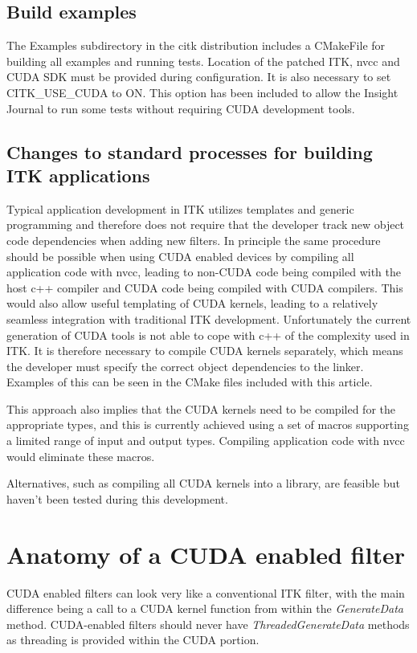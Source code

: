 \documentclass{InsightArticle}
\begin{document}
\subsection{Build examples}
The Examples subdirectory in the citk distribution includes a
CMakeFile for building all examples and running tests. Location of the
patched ITK, nvcc and CUDA SDK must be provided during
configuration. It is also necessary to set CITK\_USE\_CUDA to ON. This
option has been included to allow the Insight Journal to run some
tests without requiring CUDA development tools.

\subsection{Changes to standard processes for building ITK applications}
Typical application development in ITK utilizes templates and generic
programming and therefore does not require that the developer track
new object code dependencies when adding new filters. In principle the
same procedure should be possible when using CUDA enabled devices by
compiling all application code with nvcc, leading to non-CUDA code
being compiled with the host c++ compiler and CUDA code being compiled
with CUDA compilers. This would also allow useful templating of CUDA
kernels, leading to a relatively seamless integration with traditional
ITK development. Unfortunately the current generation of CUDA tools is
not able to cope with c++ of the complexity used in ITK. It is
therefore necessary to compile CUDA kernels separately, which means
the developer must specify the correct object dependencies to the
linker. Examples of this can be seen in the CMake files included with
this article.

This approach also implies that the CUDA kernels need to be compiled
for the appropriate types, and this is currently achieved using a set
of macros supporting a limited range of input and output
types. Compiling application code with nvcc would eliminate these
macros.

Alternatives, such as compiling all CUDA kernels into a library, are
feasible but haven't been tested during this development.



\section{Anatomy of a CUDA enabled filter}
CUDA enabled filters can look very like a conventional ITK filter,
with the main difference being a call to a CUDA kernel function from
within the {\em GenerateData} method. CUDA-enabled filters should
never have {\em ThreadedGenerateData} methods as threading is provided
within the CUDA portion.
\end{document}
